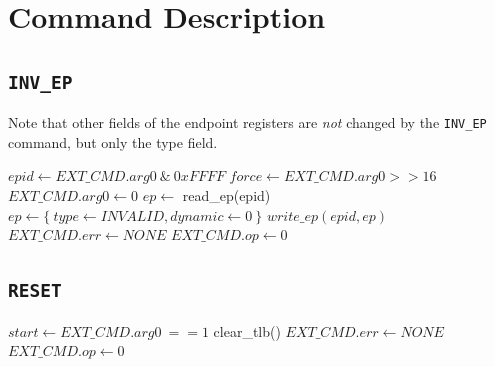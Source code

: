 \section{Command Description}

\subsection{\texttt{INV\_EP}}
\label{sec:epinval}

Note that other fields of the endpoint registers are \emph{not} changed by the \texttt{INV\_EP}
command, but only the type field.

\begin{algorithm}[H]
    $epid \gets EXT\_CMD.arg0\ \&\ 0xFFFF$\;
    $force \gets EXT\_CMD.arg0 >> 16$\;
    \BlankLine
    $EXT\_CMD.arg0 \gets 0$\;
    \BlankLine
    $ep \gets$ read\_ep(epid)\;
    \BlankLine
    $ep \gets \{~type \gets INVALID, dynamic \gets 0~\}$\;
    $write\_ep(epid, ep)$\;
    \BlankLine
    $EXT\_CMD.err \gets NONE$\;
    $EXT\_CMD.op \gets 0$\;
    \caption{The TCU's \texttt{INV\_EP} command.}
\end{algorithm}

\subsection{\texttt{RESET}}

\begin{algorithm}[H]
    $start \gets EXT\_CMD.arg0\ == 1$\;
    \BlankLine
    clear\_tlb()\;
    \BlankLine
    $EXT\_CMD.err \gets NONE$\;
    $EXT\_CMD.op \gets 0$\;
    \caption{The TCU's \texttt{RESET} command.}
\end{algorithm}
